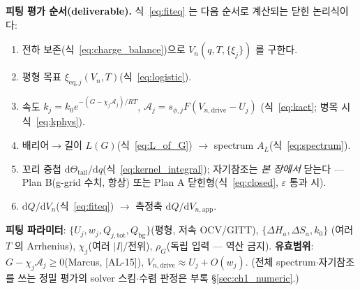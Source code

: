 \documentclass[11pt,a4paper]{article}
\newcommand{\dd}{\mathrm{d}}
\newcommand{\eq}{\mathrm{eq}}
\newcommand{\app}{\mathrm{app}}
\newcommand{\drive}{\mathrm{drive}}
\newcommand{\bg}{\mathrm{bg}}
\newcommand{\tot}{\mathrm{tot}}
\newcommand{\AL}[1]{\textsf{[AL-#1]}}
\begin{document}
\textbf{피팅 평가 순서(deliverable).} 식~\eqref{eq:fiteq} 는 다음 순서로 계산되는 닫힌 논리식이다:
\begin{enumerate}[label=\textbf{S\arabic*.},leftmargin=2.4em]
\item 전하 보존(식~\eqref{eq:charge_balance})으로 $V_n(q,T,\{\xi_j\})$ 를 구한다.
\item 평형 목표 $\xi_{\eq,j}(V_n,T)$(식~\eqref{eq:logistic}).
\item 속도 $k_j=k_0 e^{-(G-\chi_j\mathcal A_j)/RT}$, $\mathcal A_j=s_{\phi,j}F(V_{n,\drive}-U_j)$
  (식~\eqref{eq:kact}; 병목 시 식~\eqref{eq:kphys}).
\item 배리어$\to$길이 $L(G)$(식~\eqref{eq:L_of_G}) $\to$ spectrum $A_L$(식~\eqref{eq:spectrum}).
\item 꼬리 중첩 $\dd\Theta_\mathrm{tail}/\dd q$(식~\eqref{eq:kernel_integral}); 자기참조는 \emph{본 장에서} 닫는다 —
  Plan B(g-grid 수치, 항상) 또는 Plan A 닫힌형(식~\eqref{eq:closed}, $\varepsilon$ 통과 시).
\item $\dd Q/\dd V_n$(식~\eqref{eq:fiteq}) $\to$ 측정축 $\dd Q/\dd V_{n,\app}$.
\end{enumerate}
\textbf{피팅 파라미터}: $\{U_j,w_j,Q_{j,\tot},Q_\bg\}$(평형, 저속 OCV/GITT), $\{\Delta H_a,\Delta S_a,k_0\}$
(여러 $T$ 의 Arrhenius), $\chi_j$(여러 $|I|$/전위), $\rho_G$(독립 입력 — 역산 금지). \textbf{유효범위}:
$G-\chi_j\mathcal A_j\ge0$(Marcus, \AL{15}), $V_{n,\drive}\approx U_j+O(w_j)$. (전체 spectrum$\cdot$자기참조를
쓰는 정밀 평가의 solver 스킴$\cdot$수렴 판정은 부록 \S\ref{sec:ch1_numeric}.)
\end{document}
